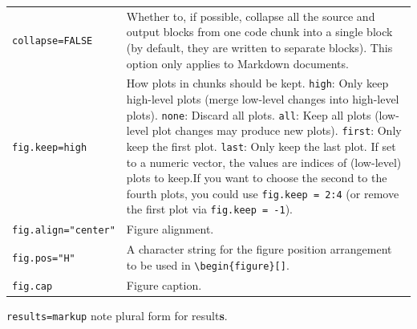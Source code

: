 \documentclass[
  a4paper,
  twoside,
  openright]{book}
\theoremstyle{definition}
\theoremstyle{definition}
\theoremstyle{definition}
\theoremstyle{definition}
\theoremstyle{remark}
\begin{document}
\begin{longtable}[]{@{}
  >{\raggedright\arraybackslash}p{}
  >{\raggedright\arraybackslash}p{}@{}}
\texttt{collapse=FALSE} & Whether to, if possible, collapse all the source and output blocks from one code chunk into a single block (by default, they are written to separate blocks). This option only applies to Markdown documents. \\
\texttt{fig.keep=\textquotesingle{}high\textquotesingle{}} & How plots in chunks should be kept. \texttt{high}: Only keep high-level plots (merge low-level changes into high-level plots). \texttt{none}: Discard all plots. \texttt{all}: Keep all plots (low-level plot changes may produce new plots). \texttt{first}: Only keep the first plot. \texttt{last}: Only keep the last plot. If set to a numeric vector, the values are indices of (low-level) plots to keep.If you want to choose the second to the fourth plots, you could use \texttt{fig.keep\ =\ 2:4} (or remove the first plot via \texttt{fig.keep\ =\ -1}). \\
\texttt{fig.align="center"} & Figure alignment. \\
\texttt{fig.pos="H"} & A character string for the figure position arrangement to be used in \texttt{\textbackslash{}begin\{figure\}{[}{]}}. \\
\texttt{fig.cap} & Figure caption. \\
\end{longtable}

{\texttt{results=\textquotesingle{}markup\textquotesingle{}}} note plural form for result\textbf{s}.
\end{document}
